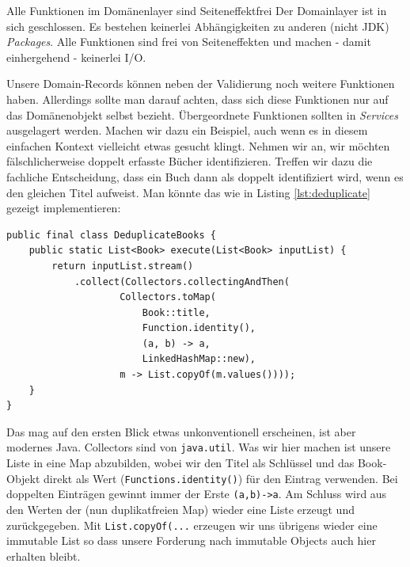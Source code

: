 \begin{rulebox}[label=rule:pureDomain]
    {Alle Funktionen im Domänenlayer sind Seiteneffektfrei}
Der Domainlayer ist in sich geschlossen. Es bestehen keinerlei Abhängigkeiten
zu anderen (nicht JDK) \textit{Packages}. Alle Funktionen sind frei von
Seiteneffekten und machen - damit einhergehend - keinerlei I/O.
\end{rulebox}

Unsere Domain-Records können neben der Validierung noch weitere Funktionen
haben. Allerdings sollte man darauf achten, dass sich diese Funktionen
nur auf das Domänenobjekt selbst bezieht. Übergeordnete Funktionen sollten
in \textit{Services} ausgelagert werden. Machen wir dazu ein Beispiel, auch
wenn es in diesem einfachen Kontext vielleicht etwas gesucht klingt.
Nehmen wir an, wir möchten fälschlicherweise doppelt erfasste Bücher
identifizieren. Treffen wir dazu die fachliche Entscheidung, dass ein 
Buch dann als doppelt identifiziert wird, wenn es den gleichen Titel
aufweist. Man könnte das wie in Listing \ref{lst:deduplicate} gezeigt 
implementieren:

\begin{listing}[H]
\begin{verbatim}
public final class DeduplicateBooks {
    public static List<Book> execute(List<Book> inputList) {
        return inputList.stream()
            .collect(Collectors.collectingAndThen(
                    Collectors.toMap(
                        Book::title,
                        Function.identity(),
                        (a, b) -> a,        
                        LinkedHashMap::new),
                    m -> List.copyOf(m.values())));
    }
}
\end{verbatim}
\caption{Deduplicate-Service}
\label{lst:deduplicate}
\end{listing}

Das mag auf den ersten Blick etwas unkonventionell erscheinen, ist aber
modernes Java. Collectors sind von \texttt{java.util}. Was wir hier
machen ist unsere Liste in eine Map abzubilden, wobei wir den Titel
als Schlüssel und das Book-Objekt direkt als Wert 
(\texttt{Functions.identity()}) für den Eintrag verwenden. Bei doppelten
Einträgen gewinnt immer der Erste \texttt{(a,b)->a}. Am Schluss wird
aus den Werten der (nun duplikatfreien Map) wieder eine Liste erzeugt
und zurückgegeben. Mit \texttt{List.copyOf(...} erzeugen wir uns
übrigens wieder eine immutable List so dass unsere Forderung nach
immutable Objects auch hier erhalten bleibt.

